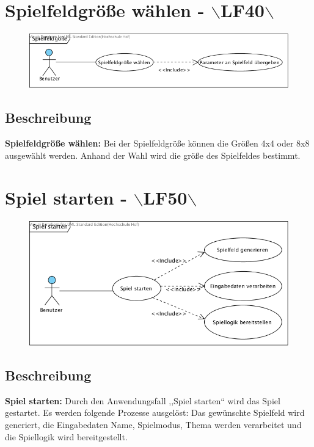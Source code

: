 \clearpage
\section{Spielfeldgröße wählen - $\backslash$LF40$\backslash$}
\begin{figure}[!h]
	\centering
    \includegraphics[width=\textwidth]{./Spielfeldgroesse.png}
	\label{layout_gesamt}
\end{figure}

\subsection{Beschreibung}
\textbf{Spielfeldgröße wählen: }Bei der Spielfeldgröße können die Größen 4x4 oder 8x8 ausgewählt werden. Anhand der Wahl wird die größe des Spielfeldes bestimmt.

\clearpage
\section{Spiel starten - $\backslash$LF50$\backslash$}
\begin{figure}[!h]
	\centering
    \includegraphics[width=\textwidth]{./SpielStarten.png}
	\label{layout_gesamt}
\end{figure}

\subsection{Beschreibung}
\textbf{Spiel starten: } Durch den Anwendungsfall ,,Spiel starten`` wird das Spiel gestartet. Es werden folgende Prozesse ausgelöst: Das gewünschte Spielfeld wird generiert, die Eingabedaten Name, Spielmodus, Thema werden verarbeitet und die Spiellogik wird bereitgestellt.

